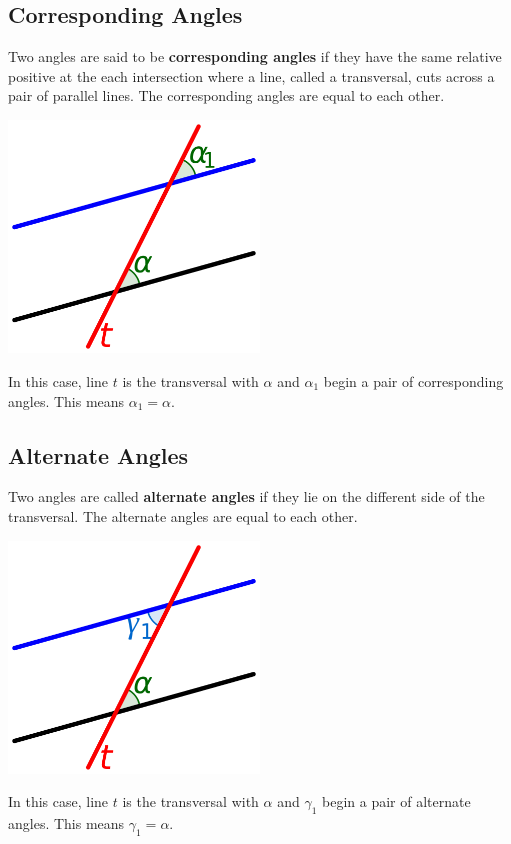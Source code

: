 \documentclass[12pt,a4paper]{article}
\begin{document}
\subsection{Corresponding Angles}
Two angles are said to be {\bf corresponding angles} if they have the same relative 
positive at the each intersection where
a line, called a transversal, cuts across a pair of parallel lines. 
The corresponding angles are equal to each other. 
\begin{center}
\includegraphics[width=0.5\textwidth]{corr.png}
\end{center}
In this case, line \(t\) is the transversal with
\(\alpha\) and \(\alpha_1\) begin a pair of 
corresponding angles. This means \(\alpha_1=\alpha\).
\newpage
\subsection{Alternate Angles}
Two angles are called {\bf alternate angles}
if they lie on the different side of the transversal.
The alternate angles are equal to each other. 
\begin{center}
\includegraphics[width=0.5\textwidth]{alt.png}
\end{center}
In this case, line \(t\) is the transversal with
\(\alpha\) and \(\gamma_1\) begin a pair of 
alternate angles. This means \(\gamma_1=\alpha\).
\newpage
\end{document}
